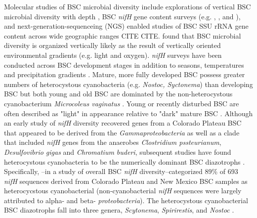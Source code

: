 Molecular studies of BSC microbial diversity include explorations of vertical BSC microbial diversity with depth \cite{Garcia_Pichel_2003}, BSC \textit{nifH} gene content surveys (e.g. \citet{14766579}, \citet{Yeager_2012}, \citet{Yeager} and \citet{Steppe_1996}), and next-generation-sequenceing (NGS) enabled studies of BSC SSU rRNA gene content across wide geographic ranges CITE CITE. \citet{Garcia_Pichel_2003} found that BSC microbial diversity is organized vertically likely as the result of vertically oriented environmental gradients (e.g. light and oxygen). \textit{nifH} surveys have been conducted across BSC development stages \cite{14766579} in addition to seasons, temperatures and precipitation gradients \cite{Yeager_2012}. Mature, more fully developed BSC possess greater numbers of heterocystous cyanobacteria (e.g. \textit{Nostoc, Syctonema}) than developing BSC but both young and old BSC are dominated by the non-heterocystous cyanobacterium \textit{Microcoleus vaginatus} \cite{14766579}. Young or recently disturbed BSC are often described as "light" in appearance relative to "dark" mature BSC \cite{Belnap_2002}.  Although an early study of \textit{nifH} diversity recovered genes from a Colorado Plateau BSC that appeared to be derived from the \textit{Gammaproteobacteria} as well as a clade that included \textit{nifH} genes from the anaerobes \textit{Clostridium pssteurianum}, \textit{Desulfovibrio gigas} and \textit{Chromatium buderi}, subsequent studies have found heterocystous cyanobacteria to be the numerically dominant BSC diazotrophs \cite{Yeager, 14766579, Yeager_2012}. Specifically, \citet{Yeager}--in a study of overall BSC \textit{nifH} diversity--categorized 89\% of 693 \textit{nifH} sequences derived from Colorado Plateau and New Mexico BSC samples as heterocycstous cyanobacterial (non-cyanobacterial \textit{nifH} sequences were largely attributed to alpha- and beta- \textit{proteobacteria}). The heterocystous cyanobacterial BSC diazotrophs fall into three genera, \textit{Scytonema}, \textit{Spirirestis}, and \textit{Nostoc} \cite{Yeager, Yeager_2012}.

